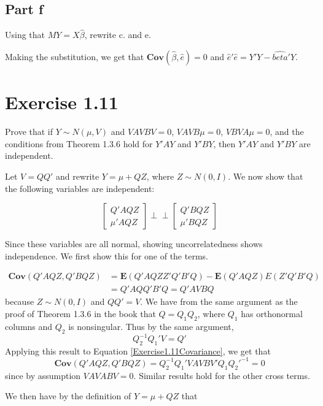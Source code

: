 \documentclass{article}
\newcommand{\indep}{\perp \!\!\! \perp}
\newcommand{\E}{\boldsymbol{E}}
\newcommand{\cov}{\boldsymbol{Cov}}
\begin{document}
\subsection*{Part f}

Using that $MY=X\hat{\beta}$, rewrite c. and e.

Making the substitution, we get that $\cov(\hat{\beta}, \hat{e}) = 0$ and $\hat{e}'\hat{e} = Y'Y - \hat{beta}'Y$.

\section*{Exercise 1.11}

Prove that if $Y \sim N(\mu, V)$ and $VAVBV=0$, $VAVB\mu=0$, $VBVA\mu=0$, and the conditions from Theorem 1.3.6 hold for $Y'AY$ and $Y'BY$, then $Y'AY$ and $Y'BY$ are independent.

Let $V=QQ'$ and rewrite $Y=\mu + QZ$, where $Z\sim N(0,I)$. We now show that the following variables are independent:

\begin{equation}
\label{Exercise1.11Independence}
\begin{bmatrix}
Q'AQZ \\
\mu'AQZ
\end{bmatrix}
\indep
\begin{bmatrix}
Q'BQZ \\
\mu'BQZ
\end{bmatrix}
\end{equation}

Since these variables are all normal, showing uncorrelatedness shows independence. We first show this for one of the terms.

\begin{align}
\label{Exercise1.11Covariance}
\cov(Q'AQZ, Q'BQZ) &= \E(Q'AQZZ'Q'B'Q) - \E(Q'AQZ)E(Z'Q'B'Q) \\
&= Q'AQQ'B'Q = Q'AVBQ
\end{align}
because $Z \sim N(0, I)$ and $QQ' = V$. We have from the same argument as the proof of Theorem 1.3.6 in the book that $Q = Q_1Q_2$, where $Q_1$ has orthonormal columns and $Q_2$ is nonsingular. Thus by the same argument,
\[
Q_2^{-1}Q_1'V = Q'
\]
Applying this result to Equation \ref{Exercise1.11Covariance}, we get that
\[
\cov(Q'AQZ, Q'BQZ)=Q_2^{-1}Q_1'VAVBV'Q_1Q_2'^{-1} = 0
\]
since by assumption $VAVABV=0$. Similar results hold for the other cross terms.

We then have by the definition of $Y=\mu+QZ$ that
\end{document}

